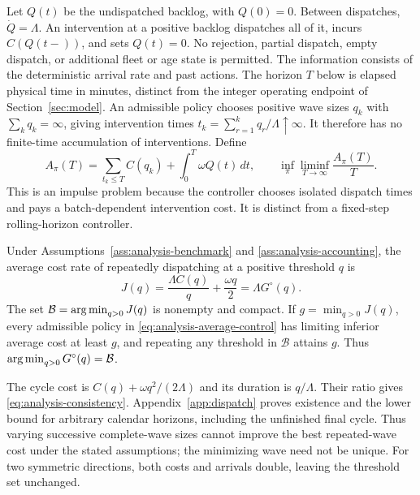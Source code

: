 Let $Q(t)$ be the undispatched backlog, with $Q(0)=0$. Between dispatches,
$\dot Q=\Lambda$. An intervention at a positive backlog dispatches all of
it, incurs $C(Q(t-))$, and sets $Q(t)=0$. No rejection, partial dispatch,
empty dispatch, or additional fleet or age state is permitted. The
information consists of the deterministic arrival rate and past actions.
The horizon $T$ below is elapsed physical time in minutes, distinct from
the integer operating endpoint of Section~\ref{sec:model}.
An admissible policy chooses positive wave sizes $q_k$ with
$\sum_k q_k=\infty$, giving intervention times
$t_k=\sum_{r=1}^k q_r/\Lambda\uparrow\infty$. It therefore has no finite-time
accumulation of interventions. Define
\begin{equation}
 A_\pi(T)=\sum_{t_k\le T}C(q_k)+\int_0^T\omega Q(t)\,dt,
 \qquad
 \inf_\pi\liminf_{T\to\infty}\frac{A_\pi(T)}T.
 \label{eq:analysis-average-control}
\end{equation}
This is an impulse problem because the controller chooses isolated dispatch
times and pays a batch-dependent intervention cost. It is distinct from a
fixed-step rolling-horizon controller.

\begin{theorem}
\label{thm:analysis-consistency}
Under Assumptions~\ref{ass:analysis-benchmark} and
\ref{ass:analysis-accounting}, the average cost rate of repeatedly dispatching
at a positive threshold $q$ is
\begin{equation}
 J(q)=\frac{\Lambda C(q)}q+\frac{\omega q}2
     =\Lambda G^\circ(q).
 \label{eq:analysis-consistency}
\end{equation}
The set $\mathcal B=\operatorname*{arg\,min}_{q>0}J(q)$ is nonempty and compact. If
$g=\min_{q>0}J(q)$, every admissible policy in
\eqref{eq:analysis-average-control} has limiting inferior average cost at
least $g$, and repeating any threshold in $\mathcal B$ attains $g$.
Thus $\operatorname*{arg\,min}_{q>0}G^\circ(q)=\mathcal B$.
\end{theorem}

The cycle cost is $C(q)+\omega q^2/(2\Lambda)$ and its duration is
$q/\Lambda$. Their ratio gives \eqref{eq:analysis-consistency}.
Appendix~\ref{app:dispatch} proves existence and the lower bound for arbitrary
calendar horizons, including the unfinished final cycle. Thus varying
successive complete-wave sizes cannot improve the best repeated-wave
cost under the stated assumptions; the minimizing wave need not be unique.
For two symmetric directions, both costs and arrivals double, leaving the
threshold set unchanged.

